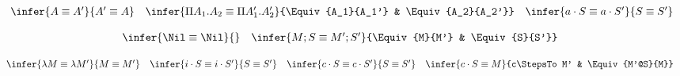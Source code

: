 \bigskip 
{}
\bigskip 

$$
\begin{array}{lcr}\
\infer{\Equiv{A}{A'}}{\Equiv{A'}{A}} &  
\infer{\Equiv{\PiTyp{A_1}{A_2}}{\PiTyp{A_1'}{A_2'}}}{\Equiv{A_1}{A_1'} & \Equiv{A_2}{A_2'}} & 
\infer{\Equiv{a\cdot S}{a\cdot S'}}{\Equiv{S}{S'}} 
\end{array} 
$$

\bigskip 
{}
\bigskip 

$$
\begin{array}{lcr}
\infer{\Equiv{\Nil}{\Nil}}{} &
\infer{\Equiv{M;S}{M';S'}}{\Equiv{M}{M'} & \Equiv{S}{S'}}
\end{array} 
$$

\bigskip 
{}
\bigskip 

$$
\begin{array}{cccc}
\infer{\Equiv{\Lam{M}}{\Lam{M'}}}{\Equiv{M}{M'}} &
\infer{\Equiv{i\cdot S}{i\cdot S'}}{\Equiv{S}{S'}} &
\infer{\Equiv{c\cdot S}{c\cdot S'}}{\Equiv{S}{S'}} &
\infer{\Equiv{c\cdot S}{M}}{c\StepsTo M' & \Equiv{M'@S}{M}} 
\end{array} 
$$
